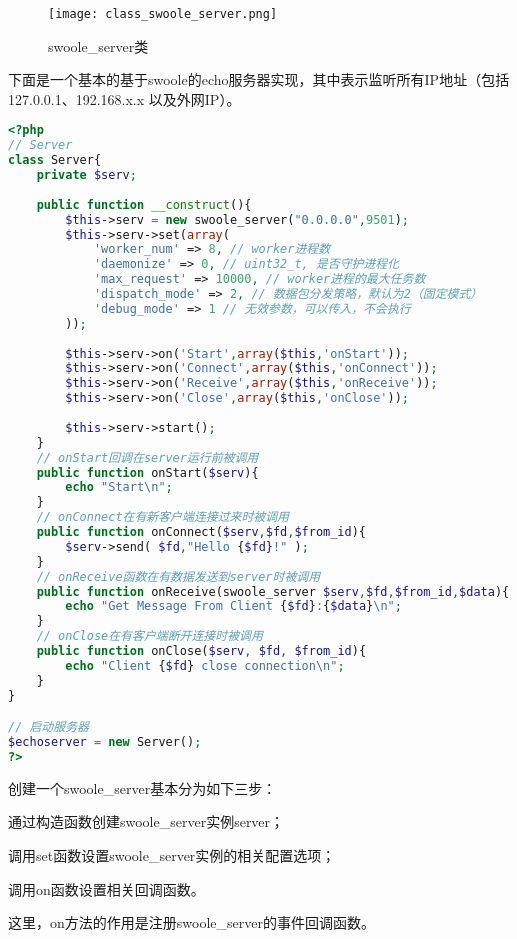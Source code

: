 \begin{figure}[htbp]
\centering
\texttt{[image: class\_swoole\_server.png]}
\caption{swoole\_server类}
\end{figure}


下面是一个基本的基于swoole的echo服务器实现，其中表示监听所有IP地址（包括 127.0.0.1、192.168.x.x 以及外网IP）。



\begin{lstlisting}[language=PHP]
<?php
// Server
class Server{
	private $serv;
	
	public function __construct(){
		$this->serv = new swoole_server("0.0.0.0",9501);
		$this->serv->set(array(
			'worker_num' => 8, // worker进程数
			'daemonize' => 0, // uint32_t, 是否守护进程化
			'max_request' => 10000, // worker进程的最大任务数
			'dispatch_mode' => 2, // 数据包分发策略，默认为2（固定模式）
			'debug_mode' => 1 // 无效参数，可以传入，不会执行
		));
		
		$this->serv->on('Start',array($this,'onStart'));
		$this->serv->on('Connect',array($this,'onConnect'));
		$this->serv->on('Receive',array($this,'onReceive'));
		$this->serv->on('Close',array($this,'onClose'));
		
		$this->serv->start();
	}
	// onStart回调在server运行前被调用
	public function onStart($serv){ 
		echo "Start\n";
	}
	// onConnect在有新客户端连接过来时被调用
	public function onConnect($serv,$fd,$from_id){ 
		$serv->send( $fd,"Hello {$fd}!" );
	}
	// onReceive函数在有数据发送到server时被调用
	public function onReceive(swoole_server $serv,$fd,$from_id,$data){
		echo "Get Message From Client {$fd}:{$data}\n";
	}
	// onClose在有客户端断开连接时被调用
	public function onClose($serv, $fd, $from_id){
		echo "Client {$fd} close connection\n";
	}
}

// 启动服务器
$echoserver = new Server();
?>
\end{lstlisting}

创建一个swoole\_server基本分为如下三步：

\begin{compactitem}
\item 通过构造函数创建swoole\_server实例server；
\item 调用set函数设置swoole\_server实例的相关配置选项；
\item 调用on函数设置相关回调函数。
\end{compactitem}

这里，on方法的作用是注册swoole\_server的事件回调函数。

